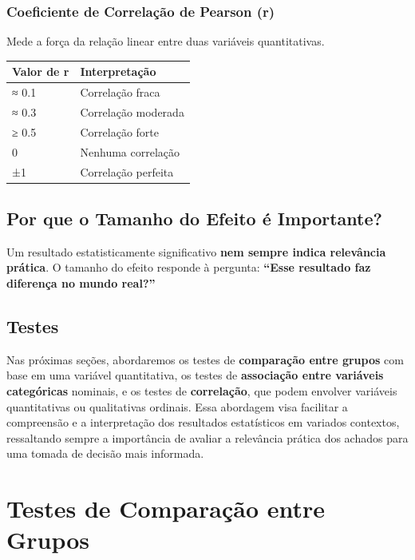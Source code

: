 \documentclass[
]{book}
\begin{document}
\subsection{Coeficiente de Correlação de Pearson (r)}\label{coeficiente-de-correlauxe7uxe3o-de-pearson-r}

Mede a força da relação linear entre duas variáveis quantitativas.

\begin{longtable}[]{@{}ll@{}}
\toprule\noalign{}
Valor de r & Interpretação \\
\midrule\noalign{}
\endhead
\bottomrule\noalign{}
\endlastfoot
≈ 0.1 & Correlação fraca \\
≈ 0.3 & Correlação moderada \\
≥ 0.5 & Correlação forte \\
0 & Nenhuma correlação \\
±1 & Correlação perfeita \\
\end{longtable}

\section{Por que o Tamanho do Efeito é Importante?}\label{por-que-o-tamanho-do-efeito-uxe9-importante}

Um resultado estatisticamente significativo \textbf{nem sempre indica relevância prática}. O tamanho do efeito responde à pergunta: \textbf{``Esse resultado faz diferença no mundo real?''}

\section{Testes}\label{testes}

Nas próximas seções, abordaremos os testes de \textbf{comparação entre grupos} com base em uma variável quantitativa, os testes de \textbf{associação entre variáveis categóricas} nominais, e os testes de \textbf{correlação}, que podem envolver variáveis quantitativas ou qualitativas ordinais. Essa abordagem visa facilitar a compreensão e a interpretação dos resultados estatísticos em variados contextos, ressaltando sempre a importância de avaliar a relevância prática dos achados para uma tomada de decisão mais informada.

\chapter{Testes de Comparação entre Grupos}\label{testes-de-comparauxe7uxe3o-entre-grupos}
\end{document}

